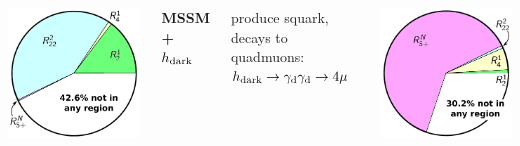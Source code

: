\documentclass[compress]{beamer}
\newcommand{\s}[1]{{\mbox{\scriptsize #1}}}
\begin{document}
\begin{frame}
\begin{columns}
\includegraphics[width=\linewidth]{pie_gammadark.pdf}

{\bf MSSM + $h_\s{dark}$}

produce squark, decays to quadmuons: \mbox{$h_\s{dark} \to \gamma_\s{d}\gamma_\s{d} \to 4\mu$\hspace{-1 cm}}

\includegraphics[width=\linewidth]{pie_higgsdark.pdf}
\end{columns}
\end{frame}
\end{document}

